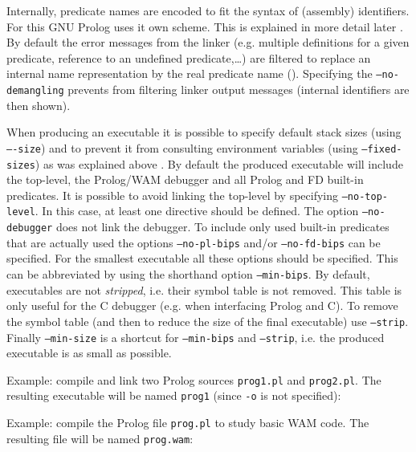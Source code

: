 
Internally, predicate names are encoded to fit the syntax of (assembly)
identifiers. For this GNU Prolog uses it own  scheme. This
is explained in more detail later . By default
the error messages from the linker (e.g. multiple definitions for a given
predicate, reference to an undefined predicate,\ldots) are filtered to
replace an internal name representation by the real predicate name
(). Specifying the \texttt{--no-demangling} prevents
 from filtering linker output messages (internal identifiers are
then shown).

When producing an executable it is possible to specify default stack sizes
(using \texttt{---size}) and to prevent it from consulting
environment variables (using \texttt{--fixed-sizes}) as was explained above
. By default the produced
executable will include the top-level, the Prolog/WAM debugger
and all Prolog and FD built-in predicates. It is possible to avoid linking
the top-level  by specifying
\texttt{--no-top-level}. In this case, at least one
 directive  should be
defined. The option \texttt{--no-debugger} does not link the debugger. To
include only used built-in predicates that are actually used the options
\texttt{--no-pl-bips} and/or \texttt{--no-fd-bips} can be specified. For the
smallest executable all these options should be specified. This can be
abbreviated by using the shorthand option \texttt{--min-bips}. By default,
executables are not \emph{stripped}, i.e. their symbol table is not
removed. This table is only useful for the C debugger (e.g. when interfacing
Prolog and C). To remove the symbol table (and then to reduce the size of
the final executable) use \texttt{--strip}. Finally \texttt{--min-size} is a
shortcut for \texttt{--min-bips} and \texttt{--strip}, i.e. the produced
executable is as small as possible.

Example: compile and link two Prolog sources \texttt{prog1.pl} and
\texttt{prog2.pl}. The resulting executable will be named \texttt{prog1}
(since \texttt{-o} is not specified):


Example: compile the Prolog file \texttt{prog.pl} to study basic WAM code.
The resulting file will be named \texttt{prog.wam}:

